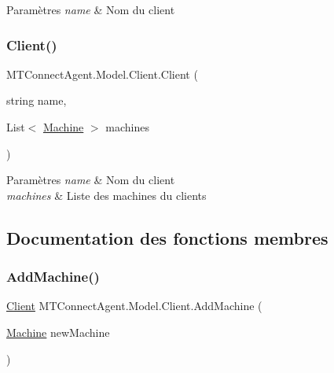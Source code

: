 \begin{DoxyParams}{Paramètres}
{\em name} & Nom du client\\
\hline
\end{DoxyParams}
\mbox{\label{class_m_t_connect_agent_1_1_model_1_1_client_ac519ea113d1eae1e94b96052c6ccfec6}} 
\subsubsection{\texorpdfstring{Client()}{Client()}\hspace{0.1cm}{\footnotesize\ttfamily [2/2]}}
{\footnotesize\ttfamily M\+T\+Connect\+Agent.\+Model.\+Client.\+Client (\begin{DoxyParamCaption}\item[{string}]{name,  }\item[{List$<$ \mbox{\hyperlink{class_m_t_connect_agent_1_1_model_1_1_machine}{Machine}} $>$}]{machines }\end{DoxyParamCaption})\hspace{0.3cm}{\ttfamily [inline]}}






\begin{DoxyParams}{Paramètres}
{\em name} & Nom du client\\
\hline
{\em machines} & Liste des machines du clients\\
\hline
\end{DoxyParams}


\subsection{Documentation des fonctions membres}
\mbox{\label{class_m_t_connect_agent_1_1_model_1_1_client_a692b1cbfd5063222488d3af36d8fd703}} 
\subsubsection{\texorpdfstring{Add\+Machine()}{AddMachine()}}
{\footnotesize\ttfamily \mbox{\hyperlink{class_m_t_connect_agent_1_1_model_1_1_client}{Client}} M\+T\+Connect\+Agent.\+Model.\+Client.\+Add\+Machine (\begin{DoxyParamCaption}\item[{\mbox{\hyperlink{class_m_t_connect_agent_1_1_model_1_1_machine}{Machine}}}]{new\+Machine }\end{DoxyParamCaption})\hspace{0.3cm}{\ttfamily [inline]}}



